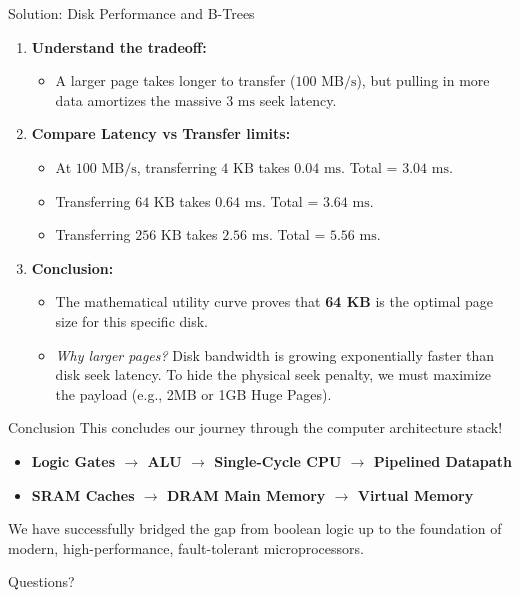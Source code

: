 \documentclass[aspectratio=169]{beamer}
\begin{document}
\begin{frame}{Solution: Disk Performance and B-Trees}
\begin{enumerate}
    \item \textbf{Understand the tradeoff:}
    \begin{itemize}
        \item A larger page takes longer to transfer ($100 \text{ MB/s}$), but pulling in more data amortizes the massive $3 \text{ ms}$ seek latency.
    \end{itemize}
    \item \textbf{Compare Latency vs Transfer limits:}
    \begin{itemize}
        \item At $100 \text{ MB/s}$, transferring $4 \text{ KB}$ takes $0.04 \text{ ms}$. Total = $3.04 \text{ ms}$.
        \item Transferring $64 \text{ KB}$ takes $0.64 \text{ ms}$. Total = $3.64 \text{ ms}$.
        \item Transferring $256 \text{ KB}$ takes $2.56 \text{ ms}$. Total = $5.56 \text{ ms}$.
    \end{itemize}
    \item \textbf{Conclusion:}
    \begin{itemize}
        \item The mathematical utility curve proves that \textbf{64 KB} is the optimal page size for this specific disk.
        \item \textit{Why larger pages?} Disk bandwidth is growing exponentially faster than disk seek latency. To hide the physical seek penalty, we must maximize the payload (e.g., 2MB or 1GB Huge Pages).
    \end{itemize}
\end{enumerate}
\end{frame}

\begin{frame}{Conclusion}
This concludes our journey through the computer architecture stack!
\vspace{0.5cm}
\begin{itemize}
    \item \textbf{Logic Gates $\rightarrow$ ALU $\rightarrow$ Single-Cycle CPU $\rightarrow$ Pipelined Datapath}
    \vspace{0.2cm}
    \item \textbf{SRAM Caches $\rightarrow$ DRAM Main Memory $\rightarrow$ Virtual Memory}
\end{itemize}
\vspace{0.5cm}
We have successfully bridged the gap from boolean logic up to the foundation of modern, high-performance, fault-tolerant microprocessors.
\end{frame}

\begin{frame}
\begin{center}
    \Huge Questions?
\end{center}
\end{frame}
\end{document}
